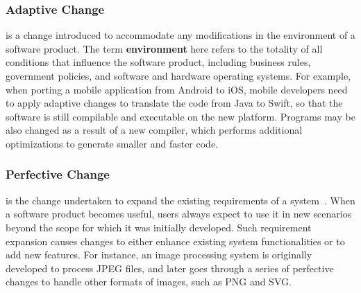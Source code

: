 \documentclass[runningheads,a4paper]{llncs}
\begin{document}
\subsubsection{Adaptive Change} is a change introduced to accommodate any modifications in the environment of a software product. The term \textbf{environment} here refers to the totality of all conditions that influence the software product, including business rules, government policies, and software and hardware operating systems. For example, when porting a mobile application from Android to iOS, mobile developers need to apply adaptive changes to translate the code from Java to Swift, so that the software is still compilable and executable on the new platform. Programs may be also changed as a result of a new compiler, which performs additional optimizations to generate smaller and faster code. 

\subsubsection{Perfective Change} is the change undertaken to expand the existing requirements of a system~\cite{Seaman2008:SMC}. When a software product becomes useful, users always expect to use it in new scenarios beyond the scope for which it was initially developed. Such requirement expansion causes changes to either enhance existing system functionalities or to add new features. For instance, an image processing system is originally developed to process JPEG files, and later goes through a series of perfective changes to handle other formats of images, such as PNG and SVG.
\end{document}
